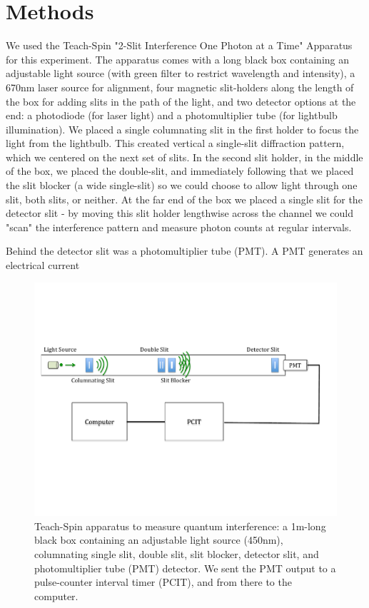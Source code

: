 \documentclass[prb,preprint]{revtex4-1}
\begin{document}
\section{Methods}

We used the Teach-Spin "2-Slit Interference One Photon at a Time" Apparatus for this experiment.  The apparatus comes with a long black box containing an adjustable light source (with green filter to restrict wavelength and intensity), a 670nm laser source for alignment, four magnetic slit-holders along the length of the box for adding slits in the path of the light, and two detector options at the end: a photodiode (for laser light) and a photomultiplier tube (for lightbulb illumination).  We placed a single columnating slit in the first holder to focus the light from the lightbulb. This created vertical a single-slit diffraction pattern, which we centered on the next set of slits.  In the second slit holder, in the middle of the box, we placed the double-slit, and immediately following that we placed the slit blocker (a wide single-slit) so we could choose to allow light through one slit, both slits, or neither.  At the far end of the box we placed a single slit for the detector slit - by moving this slit holder lengthwise across the channel we could "scan" the interference pattern and measure photon counts at regular intervals.  

Behind the detector slit was a photomultiplier tube (PMT).  A PMT generates an electrical current


\begin{figure}[h!]
\centering
\includegraphics[width=6in]{set-up.pdf}
\caption{Teach-Spin apparatus to measure quantum interference: a 1m-long black box containing an adjustable light source (450nm), columnating single slit, double slit, slit blocker, detector slit, and photomultiplier tube (PMT) detector. We sent the PMT output to a pulse-counter interval timer (PCIT), and from there to the computer.}
\label{set-up}
\end{figure}
\end{document}
